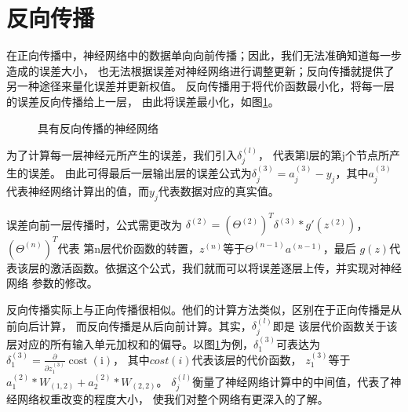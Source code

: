 \section{反向传播}
在正向传播中，神经网络中的数据单向向前传播；因此，我们无法准确知道每一步造成的误差大小，
也无法根据误差对神经网络进行调整更新；反向传播就提供了另一种途径来量化误差并更新权值。
反向传播用于将代价函数最小化，将每一层的误差反向传播给上一层，
由此将误差最小化，如图\ref{back_propagate_picture}。


\begin{figure}[!ht]
    \begin{center}
    \caption{具有反向传播的神经网络}
    \label{back_propagate_picture}
    \end{center}
\end{figure}


为了计算每一层神经元所产生的误差，我们引入$\delta_{j}^{(l)}$，
代表第l层的第j个节点所产生的误差。
由此可得最后一层输出层的误差公式为$\delta_{j}^{(3)}=a_{j}^{(3)}-y_{j}$，其中$a_{j}^{(3)}$
代表神经网络计算出的值，而$y_{j}$代表数据对应的真实值。

误差向前一层传播时，公式需更改为
$\delta^{(2)}=(\Theta^{(2)})^{T}\delta^{(3)}*g'(z^{(2)})$，$(\Theta^{(n)})^T$代表
第n层代价函数的转置，$z^{(n)}$等于$\Theta^{(n-1)} a^{(n-1)}$，最后
$g(z)$代表该层的激活函数。依据这个公式，我们就而可以将误差逐层上传，并实现对神经网络
参数的修改。

反向传播实际上与正向传播很相似。他们的计算方法类似，区别在于正向传播是从前向后计算，
而反向传播是从后向前计算。其实，$\delta_{j}^{(l)}$即是
该层代价函数关于该层对应的所有输入单元加权和的偏导。以图\ref{back_propagate_picture}为例，$\delta_{1}^{(3)}$可表达为
$\delta_{1}^{(3)}=\frac{\partial}{\partial z_{1}^{(3)}} \operatorname{cost}(\mathrm{i})$，
其中$cost(i)$代表该层的代价函数，
$z_{1}^{(3)}$等于$a_{1}^{(2)}*W_{(1,2)}+a_{2}^{(2)}*W_{(2,2)}$。
$\delta_{j}^{(l)}$衡量了神经网络计算中的中间值，代表了神经网络权重改变的程度大小，
使我们对整个网络有更深入的了解。

